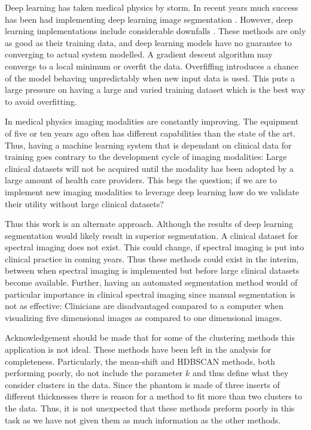 \documentclass[a4paper,11pt]{article}
\begin{document}
Deep learning has taken medical physics by storm. In recent years much success has been had implementing deep learning image segmentation \cite{isensee,Ronneberger2015U-Net:Segmentation}. However, deep learning implementations include considerable downfalls \cite{marcus}. These methods are only as good as their training data, and deep learning models have no guarantee to converging to actual system modelled. A gradient descent algorithm may converge to a local minimum or overfit the data. Overfiffing introduces a chance of the model behaving unpredictably when new input data is used. This puts a large pressure on having a large and varied training dataset which is the best way to avoid overfitting.

In medical physics imaging modalities are constantly improving. The equipment of five or ten years ago often has different capabilities than the state of the art. Thus, having a machine learning system that is dependant on clinical data for training goes contrary to the development cycle of imaging modalities: Large clinical datasets will not be acquired until the modality has been adopted by a large amount of health care providers. This begs the question; if we are to implement new imaging modalities to leverage deep learning how do we validate their utility without large clinical datasets?

Thus this work is an alternate approach. Although the results of deep learning segmentation \cite{Ronneberger2015U-Net:Segmentation} would likely result in superior segmentation. A clinical dataset for spectral imaging does not exist. This could change, if spectral imaging is put into clinical practice in coming years. Thus these methods could exist in the interim, between when spectral imaging is implemented but before large clinical datasets become available. Further, having an automated segmentation method would of particular importance in clinical spectral imaging since manual segmentation is not as effective: Clinicians are disadvantaged compared to a computer when visualizing five dimensional images as compared to one dimensional images.

Acknowledgement should be made that for some of the clustering methods this application is not ideal. These methods have been left in the analysis for completeness. Particularly, the mean-shift and HDBSCAN methods, both performing poorly, do not include the parameter $k$ and thus define what they consider clusters in the data. Since the phantom is made of three inserts of different thicknesses there is reason for a method to fit more than two clusters to the data. Thus, it is not unexpected that these methods preform poorly in this task as we have not given them as much information as the other methods. 
\end{document}
